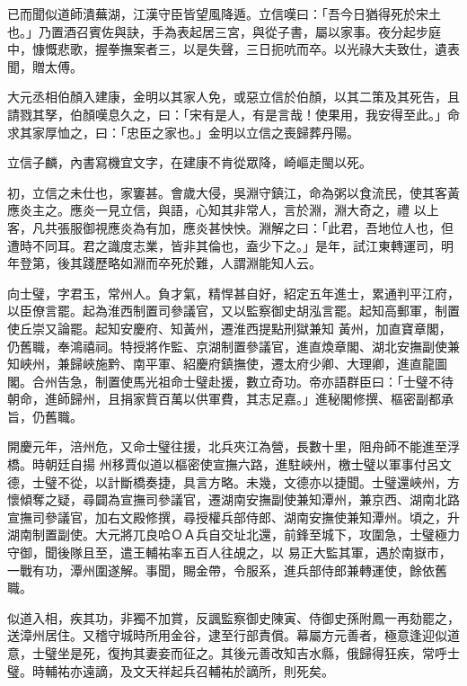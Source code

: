 \begin{pinyinscope}
 已而聞似道師潰蕪湖，江漢守臣皆望風降遁。立信嘆曰：「吾今日猶得死於宋土也。」乃置酒召賓佐與訣，手為表起居三宮，與從子書，屬以家事。夜分起步庭中，慷慨悲歌，握拳撫案者三，以是失聲，三日扼吭而卒。以光祿大夫致仕，遺表
 聞，贈太傅。



 大元丞相伯顏入建康，金明以其家人免，或惡立信於伯顏，以其二策及其死告，且請戮其孥，伯顏嘆息久之，曰：「宋有是人，有是言哉！使果用，我安得至此。」命求其家厚恤之，曰：「忠臣之家也。」金明以立信之喪歸葬丹陽。



 立信子麟，內書寫機宜文字，在建康不肯從眾降，崎嶇走閩以死。



 初，立信之未仕也，家窶甚。會歲大侵，吳淵守鎮江，命為粥以食流民，使其客黃應炎主之。應炎一見立信，與語，心知其非常人，言於淵，淵大奇之，禮
 以上客，凡共張服御視應炎為有加，應炎甚怏怏。淵解之曰：「此君，吾地位人也，但遭時不同耳。君之識度志業，皆非其倫也，盍少下之。」是年，試江東轉運司，明年登第，後其踐歷略如淵而卒死於難，人謂淵能知人云。



 向士璧，字君玉，常州人。負才氣，精悍甚自好，紹定五年進士，累通判平江府，以臣僚言罷。起為淮西制置司參議官，又以監察御史胡泓言罷。起知高郵軍，制置使丘崇又論罷。起知安慶府、知黃州，遷淮西提點刑獄兼知
 黃州，加直寶章閣，仍舊職，奉鴻禧祠。特授將作監、京湖制置參議官，進直煥章閣、湖北安撫副使兼知峽州，兼歸峽施黔、南平軍、紹慶府鎮撫使，遷太府少卿、大理卿，進直龍圖閣。合州告急，制置使馬光祖命士璧赴援，數立奇功。帝亦語群臣曰：「士璧不待朝命，進師歸州，且捐家貲百萬以供軍費，其志足嘉。」進秘閣修撰、樞密副都承旨，仍舊職。



 開慶元年，涪州危，又命士璧往援，北兵夾江為營，長數十里，阻舟師不能進至浮橋。時朝廷自揚
 州移賈似道以樞密使宣撫六路，進駐峽州，檄士璧以軍事付呂文德，士璧不從，以計斷橋奏捷，具言方略。未幾，文德亦以捷聞。士璧還峽州，方懷傾奪之疑，尋闢為宣撫司參議官，遷湖南安撫副使兼知潭州，兼京西、湖南北路宣撫司參議官，加右文殿修撰，尋授權兵部侍郎、湖南安撫使兼知潭州。頃之，升湖南制置副使。大元將兀良哈ＯＡ兵自交址北還，前鋒至城下，攻圍急，士璧極力守御，聞後隊且至，遣王輔祐率五百人往覘之，以
 易正大監其軍，遇於南嶽市，一戰有功，潭州圍遂解。事聞，賜金帶，令服系，進兵部侍郎兼轉運使，餘依舊職。



 似道入相，疾其功，非獨不加賞，反諷監察御史陳寅、侍御史孫附鳳一再劾罷之，送漳州居住。又稽守城時所用金谷，逮至行部責償。幕屬方元善者，極意逢迎似道意，士璧坐是死，復拘其妻妾而征之。其後元善改知吉水縣，俄歸得狂疾，常呼士璧。時輔祐亦遠謫，及文天祥起兵召輔祐於謫所，則死矣。




\end{pinyinscope}
